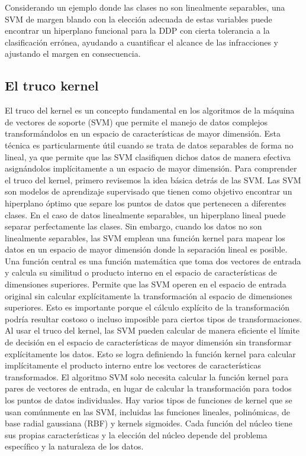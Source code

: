 Considerando un ejemplo donde las clases no son linealmente separables, una SVM de margen blando con la elección adecuada de estas variables puede encontrar un hiperplano funcional para la DDP con cierta tolerancia a la clasificación errónea, ayudando a cuantificar el alcance de las infracciones y ajustando el margen en consecuencia.

\subsection{El truco kernel}

El truco del kernel es un concepto fundamental en los algoritmos de la máquina de vectores de soporte (SVM) que permite el manejo de datos complejos transformándolos en un espacio de características de mayor dimensión. Esta técnica es particularmente útil cuando se trata de datos separables de forma no lineal, ya que permite que las SVM clasifiquen dichos datos de manera efectiva asignándolos implícitamente a un espacio de mayor dimensión.
Para comprender el truco del kernel, primero revisemos la idea básica detrás de las SVM. Las SVM son modelos de aprendizaje supervisado que tienen como objetivo encontrar un hiperplano óptimo que separe los puntos de datos que pertenecen a diferentes clases. En el caso de datos linealmente separables, un hiperplano lineal puede separar perfectamente las clases. Sin embargo, cuando los datos no son linealmente separables, las SVM emplean una función kernel para mapear los datos en un espacio de mayor dimensión donde la separación lineal es posible.
Una función central es una función matemática que toma dos vectores de entrada y calcula su similitud o producto interno en el espacio de características de dimensiones superiores. Permite que las SVM operen en el espacio de entrada original sin calcular explícitamente la transformación al espacio de dimensiones superiores. Esto es importante porque el cálculo explícito de la transformación podría resultar costoso o incluso imposible para ciertos tipos de transformaciones.
Al usar el truco del kernel, las SVM pueden calcular de manera eficiente el límite de decisión en el espacio de características de mayor dimensión sin transformar explícitamente los datos. Esto se logra definiendo la función kernel para calcular implícitamente el producto interno entre los vectores de características transformados. El algoritmo SVM solo necesita calcular la función kernel para pares de vectores de entrada, en lugar de calcular la transformación para todos los puntos de datos individuales.
Hay varios tipos de funciones de kernel que se usan comúnmente en las SVM, incluidas las funciones lineales, polinómicas, de base radial gaussiana (RBF) y kernels sigmoides. Cada función del núcleo tiene sus propias características y la elección del núcleo depende del problema específico y la naturaleza de los datos.
